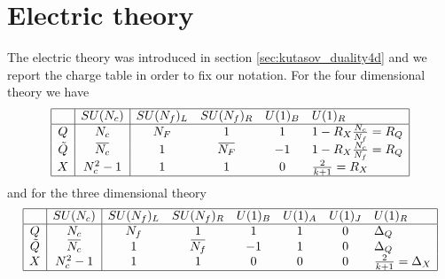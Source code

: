 \section{Electric theory}
The electric theory was introduced in section \ref{sec:kutasov_duality4d} and we report the charge table in order to fix our notation.
For the four dimensional theory we have
\begin{equation}
\begin{array}{| c | c | c c c l | }
\hline
 & SU(N_c) &SU(N_f)_L  &SU(N_f)_R   & U(1)_B &  U(1)_R \\
\hline
Q & N_c&N_F & 1   &  1  & 1 - 
R_X %
 \frac{N_c}{N_f} = R_Q \\
\tilde{Q} & \overbar{N_c} &  1 & \overbar{ N_F}   & -1   &   1 -
 R_X %
	\frac{N_c}{N_f}  = R_Q   \\
X & N_c^2-1 & 1   & 1    & 0   &  \frac{2}{k+1} = R_X \\
\hline
\end{array}
\centering
\end{equation}
%
%
and for the three dimensional theory
%
\begin{equation}
\begin{array}{ | c | c | c c c c c l |}
\hline
	& SU(N_c) & SU(N_f)_L & SU(N_f)_R& U(1)_B & U(1)_A & U(1)_J  & U(1)_R   \\
 \hline
 Q & N_c &N_f & 1& 1 & 1 & 0   & \Delta_Q  \\  
 \tilde{Q} & \overbar{N_c} & 1 & \overbar{N_f}& -1 & 1 & 0 & \Delta_Q      \\  
	X & N_c^2 -1& 1 & 1  & 0 &0 & 0 & \frac{2}{k+1} = \Delta_X  \\ 
 \hline
\end{array}
\end{equation}






